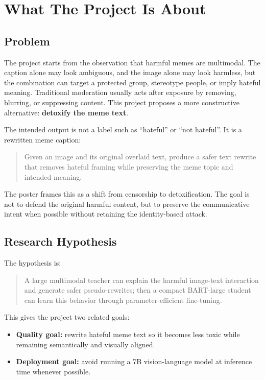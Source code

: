 \documentclass[11pt,a4paper]{article}
\begin{document}
\section{What The Project Is About}

\subsection{Problem}

The project starts from the observation that harmful memes are multimodal. The caption alone may look ambiguous, and the image alone may look harmless, but the combination can target a protected group, stereotype people, or imply hateful meaning. Traditional moderation usually acts after exposure by removing, blurring, or suppressing content. This project proposes a more constructive alternative: \textbf{detoxify the meme text}.

The intended output is not a label such as ``hateful'' or ``not hateful''. It is a rewritten meme caption:

\begin{quote}
Given an image and its original overlaid text, produce a safer text rewrite that removes hateful framing while preserving the meme topic and intended meaning.
\end{quote}

The poster frames this as a shift from censorship to detoxification. The goal is not to defend the original harmful content, but to preserve the communicative intent when possible without retaining the identity-based attack.

\subsection{Research Hypothesis}

The hypothesis is:

\begin{quote}
A large multimodal teacher can explain the harmful image-text interaction and generate safer pseudo-rewrites; then a compact BART-large student can learn this behavior through parameter-efficient fine-tuning.
\end{quote}

This gives the project two related goals:

\begin{itemize}
  \item \textbf{Quality goal:} rewrite hateful meme text so it becomes less toxic while remaining semantically and visually aligned.
  \item \textbf{Deployment goal:} avoid running a 7B vision-language model at inference time whenever possible.
\end{itemize}
\end{document}
